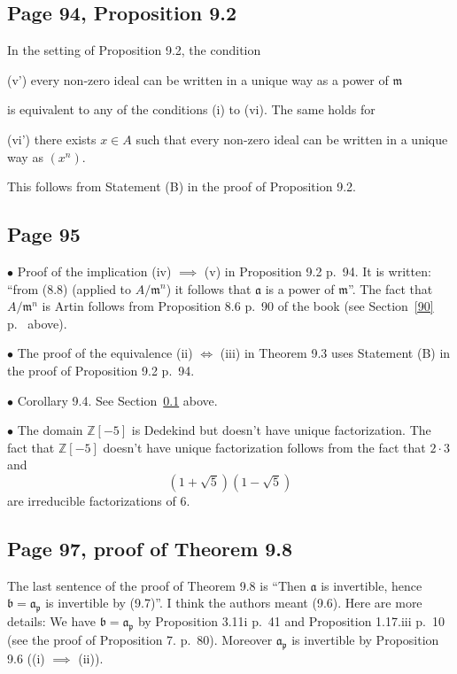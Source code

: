 \documentclass[parskip=half,fontsize=12pt]{scrartcl}%
\newcommand{\mf}{\mathfrak}
\newcommand{\aaa}{\mf a}
\newcommand{\bbb}{\mf b}
\newcommand{\mmm}{\mf m}
\newcommand{\ppp}{\mf p}
\newcommand{\bu}{\bullet}
\begin{document}
\subsection{Page 94, Proposition 9.2}\label{92}%

In the setting of Proposition 9.2, the condition

(v') every non-zero ideal can be written in a unique way as a power of $\mmm$

is equivalent to any of the conditions (i) to (vi). The same holds for

(vi') there exists $x\in A$ such that every non-zero ideal can be written in a unique way as $(x^n)$.

This follows from Statement (B) in the proof of Proposition 9.2.

\subsection{Page 95}%

$\bu$ Proof of the implication (iv) $\implies$ (v) in Proposition 9.2 p.~94. It is written: ``from (8.8) (applied to $A/\mmm^n$) it follows that $\aaa$ is a power of $\mmm$''. The fact that $A/\mmm^n$ is Artin follows from Proposition 8.6 p.~90 of the book (see Section~\ref{90} p.~\pageref{90} above). %

$\bu$ The proof of the equivalence (ii) $\iff$ (iii) in Theorem 9.3 uses Statement (B) in the proof of Proposition 9.2 p.~94.

$\bu$ Corollary 9.4. See Section~\ref{92} above.

$\bu$ The domain $\mathbb Z[-5]$ is Dedekind but doesn't have unique factorization. %
The fact that $\mathbb Z[-5]$ doesn't have unique factorization follows from the fact that $2\cdot3$ and $$\left(1+\sqrt5\right)\left(1-\sqrt5\right)$$ are irreducible factorizations of $6$.%

\subsection{Page 97, proof of Theorem 9.8}%

The last sentence of the proof of Theorem 9.8 is ``Then $\aaa$ is invertible, hence $\bbb=\aaa_\ppp$ is invertible by (9.7)''. I think the authors meant (9.6). Here are more details: We have $\bbb=\aaa_\ppp$ by Proposition 3.11i p.~41 and Proposition 1.17.iii p.~10 (see the proof of Proposition 7. p.~80). Moreover $\aaa_\ppp$ is invertible by Proposition 9.6 ((i) $\implies$ (ii)). 
\end{document}
